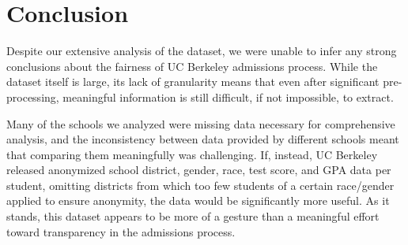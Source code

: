 \documentclass{article}
\begin{document}
\section{Conclusion}

Despite our extensive analysis of the dataset, we were unable to infer any strong conclusions about the fairness of UC Berkeley admissions process. While the dataset itself is large, its lack of granularity means that even after significant pre-processing, meaningful information is still difficult, if not impossible, to extract. 

Many of the schools we analyzed were missing data necessary for comprehensive analysis, and the inconsistency between data provided by different schools meant that comparing them meaningfully was challenging. If, instead, UC Berkeley released anonymized school district, gender, race, test score, and GPA data per student, omitting districts from which too few students of a certain race/gender applied to ensure anonymity, the data would be significantly more useful. As it stands, this dataset appears to be more of a gesture than a meaningful effort toward transparency in the admissions process.

\printbibliography
\end{document}
